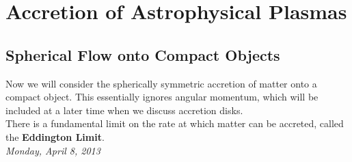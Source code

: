 \documentclass[10pt]{article}
\numberwithin{equation}{section}
\newcommand{\n}{\noindent}
\begin{document}
\section{Accretion of Astrophysical Plasmas} %
\label{sec:accretion_of_astrophysical_plasmas}
	\subsection{Spherical Flow onto Compact Objects} %
	\label{sub:spherical_flow_of_ionized_material_onto_compact_objects}
		Now we will consider the spherically symmetric accretion of matter onto a compact object. This essentially ignores angular momentum, which will be included at a later time when we discuss accretion disks.\\
		
		\n There is a fundamental limit on the rate at which matter can be accreted, called the \textbf{Eddington Limit}.\\
		
		\n\emph{Monday, April 8, 2013}\\
		
\end{document}
